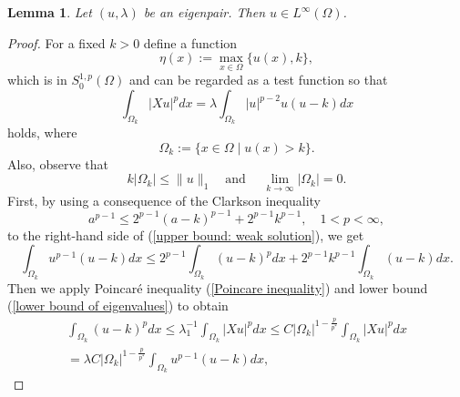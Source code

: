 \documentclass[a4paper,12pt,reqno]{amsart}
\renewcommand\eqref[1]{(\ref{#1})} %
\numberwithin{equation}{section}
\theoremstyle{plain}
\newtheorem{lem}[thm]{Lemma}
\theoremstyle{definition}
\begin{document}
\begin{lem}\label{L infty boundedness}
Let $(u,\lambda)$ be an eigenpair. Then $u\in L^{\infty}(\Omega)$.
\end{lem}
\begin{proof}
For a fixed $k>0$ define a function
\begin{equation*}
\eta(x):=\max_{x\in\Omega} \{u(x), k\},
\end{equation*}
which is in $S^{1,p}_{0}(\Omega)$ and can be regarded as a test function  so that
\begin{equation}\label{upper bound: weak solution}
\int_{\Omega_{k}}|X u|^{p} d x=\lambda \int_{\Omega_{k}}|u|^{p-2} u(u-k) d x    
\end{equation}
holds, where
\begin{equation*}
\Omega_{k}:=\{x \in \Omega \mid u(x)>k\} .
\end{equation*}
Also, observe that 
\begin{equation}\label{upper bound: some properties}
k\left|\Omega_{k}\right| \leq\|u\|_{1}\quad  \text{and }\quad  \lim_{k\to \infty}\left|\Omega_{k}\right|=0.
\end{equation}
First, by using a consequence of  the Clarkson inequality 
\begin{equation*}
a^{p-1} \leq 2^{p-1}(a-k)^{p-1}+2^{p-1} k^{p-1}, \quad 1<p<\infty, 
\end{equation*}
to the right-hand side of \eqref{upper bound: weak solution},  we get
\begin{equation}\label{upper bound: Clarkson's inequality}
\int_{\Omega_{k}} u^{p-1}(u-k) d x \leq 2^{p-1} \int_{\Omega_{k}}(u-k)^{p} d x+2^{p-1} k^{p-1} \int_{\Omega_{k}}(u-k) d x.
\end{equation}
Then we apply Poincar\'e inequality \eqref{Poincare inequality}  and lower bound \eqref{lower bound of eigenvalues} to obtain
\begin{equation}\label{upper bound: Poincare and lower bound}
\begin{aligned}
\int_{\Omega_{k}}(u-k)^{p} d x \leq\lambda_{1}^{-1} \int_{\Omega_{k}}|X u|^{p} d x \leq C \left|\Omega_{k}\right|^{1-\frac{p}{p^{*}}} \int_{\Omega_{k}}|X u|^{p} d x\\
=\lambda  C \left|\Omega_{k}\right|^{1-\frac{p}{p^{*}}}\int_{\Omega_{k}}u^{p-1} (u-k) d x,
\end{aligned}
\end{equation}

\end{proof}
\end{document}
